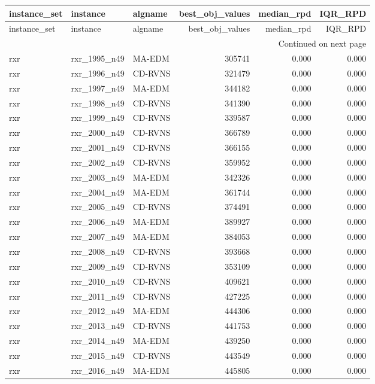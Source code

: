 \begin{longtable}{lllrrr}
\toprule
instance_set & instance & algname & best_obj_values & median_rpd & IQR_RPD \\
\midrule
\endfirsthead
\toprule
instance_set & instance & algname & best_obj_values & median_rpd & IQR_RPD \\
\midrule
\endhead
\midrule
\multicolumn{6}{r}{Continued on next page} \\
\midrule
\endfoot
\bottomrule
\endlastfoot
rxr & rxr_1995_n49 & MA-EDM & 305741 & 0.000 & 0.000 \\
rxr & rxr_1996_n49 & CD-RVNS & 321479 & 0.000 & 0.000 \\
rxr & rxr_1997_n49 & MA-EDM & 344182 & 0.000 & 0.000 \\
rxr & rxr_1998_n49 & CD-RVNS & 341390 & 0.000 & 0.000 \\
rxr & rxr_1999_n49 & CD-RVNS & 339587 & 0.000 & 0.000 \\
rxr & rxr_2000_n49 & CD-RVNS & 366789 & 0.000 & 0.000 \\
rxr & rxr_2001_n49 & CD-RVNS & 366155 & 0.000 & 0.000 \\
rxr & rxr_2002_n49 & CD-RVNS & 359952 & 0.000 & 0.000 \\
rxr & rxr_2003_n49 & MA-EDM & 342326 & 0.000 & 0.000 \\
rxr & rxr_2004_n49 & MA-EDM & 361744 & 0.000 & 0.000 \\
rxr & rxr_2005_n49 & CD-RVNS & 374491 & 0.000 & 0.000 \\
rxr & rxr_2006_n49 & MA-EDM & 389927 & 0.000 & 0.000 \\
rxr & rxr_2007_n49 & MA-EDM & 384053 & 0.000 & 0.000 \\
rxr & rxr_2008_n49 & CD-RVNS & 393668 & 0.000 & 0.000 \\
rxr & rxr_2009_n49 & CD-RVNS & 353109 & 0.000 & 0.000 \\
rxr & rxr_2010_n49 & CD-RVNS & 409621 & 0.000 & 0.000 \\
rxr & rxr_2011_n49 & CD-RVNS & 427225 & 0.000 & 0.000 \\
rxr & rxr_2012_n49 & MA-EDM & 444306 & 0.000 & 0.000 \\
rxr & rxr_2013_n49 & CD-RVNS & 441753 & 0.000 & 0.000 \\
rxr & rxr_2014_n49 & MA-EDM & 439250 & 0.000 & 0.000 \\
rxr & rxr_2015_n49 & CD-RVNS & 443549 & 0.000 & 0.000 \\
rxr & rxr_2016_n49 & MA-EDM & 445805 & 0.000 & 0.000 \\

\end{longtable}
